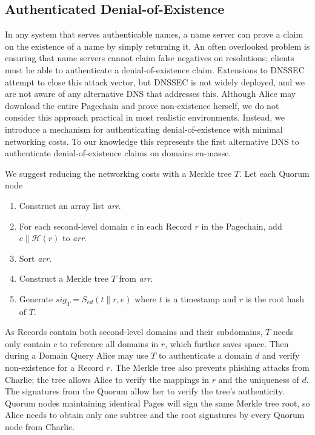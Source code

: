 \documentclass[conference]{IEEEtran}
\newcommand*\concat{\mathbin{\|}}
\begin{document}
\subsection{Authenticated Denial-of-Existence}
\label{sec:authDenial}

In any system that serves authenticable names, a name server can prove a claim on the existence of a name by simply returning it. An often overlooked problem is ensuring that name servers cannot claim false negatives on resolutions; clients must be able to authenticate a denial-of-existence claim. Extensions to DNSSEC attempt to close this attack vector, but DNSSEC is not widely deployed, and we are not aware of any alternative DNS that addresses this. Although Alice may download the entire Pagechain and prove non-existence herself, we do not consider this approach practical in most realistic environments. Instead, we introduce a mechanism for authenticating denial-of-existence with minimal networking costs. To our knowledge this represents the first alternative DNS to authenticate denial-of-existence claims on domains en-masse.

We suggest reducing the networking costs with a Merkle tree\cite{merkle1988digital} $ T $. Let each Quorum node

\begin{enumerate}
	\item Construct an array list \emph{arr}.
	\item For each second-level domain $ c $ in each Record $ r $ in the Pagechain, add $ c \concat \mathcal{H}(r) $ to \emph{arr}.
	\item Sort \emph{arr}.
	\item Construct a Merkle tree $ T $ from \emph{arr}.
	\item Generate $ \mathit{sig}_{T} = S_{\mathit{ed}}(t \concat r, e) $ where $ t $ is a timestamp and $ r $ is the root hash of $ T $.
\end{enumerate}

As Records contain both second-level domains and their subdomains, $ T $ needs only contain $ c $ to reference all domains in $ r $, which further saves space. Then during a Domain Query Alice may use $ T $ to authenticate a domain $ d $ and verify non-existence for a Record $ r $. The Merkle tree also prevents phishing attacks from Charlie; the tree allows Alice to verify the mappings in $ r $ and the uniqueness of $ d $. The signatures from the Quorum allow her to verify the tree's authenticity. Quorum nodes maintaining identical Pages will sign the same Merkle tree root, so Alice needs to obtain only one subtree and the root signatures by every Quorum node from Charlie.
\end{document}
